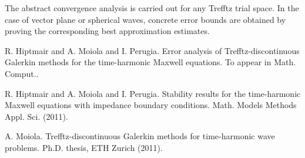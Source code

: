 The abstract convergence analysis is carried out for any Trefftz trial space. In the case of vector plane or spherical waves, concrete error
bounds are obtained by proving the corresponding best approximation estimates.


\begin{thebibliography}{10}

{\sc R. Hiptmair and A. Moiola and I. Perugia}. {Error analysis of Trefftz-discontinuous Galerkin methods for the time-harmonic Maxwell equations}. To appear in Math. Comput..



{\sc R. Hiptmair and A. Moiola and I. Perugia}. {Stability results for the time-harmonic Maxwell equations with impedance boundary conditions}. Math. Models Methods Appl. Sci. (2011).



{\sc A. Moiola}. {Trefftz-discontinuous Galerkin methods for time-harmonic wave problems}. Ph.D. thesis, ETH Zurich (2011).

\end{thebibliography}
